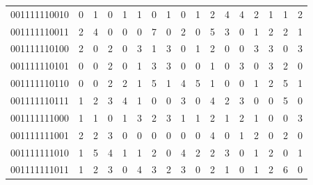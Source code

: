 \documentclass[10pt,a4paper]{article}
\begin{document}
\begin{longtable}{ |c|c|c|c|c|c|c|c|c|c|c|c|c|c|c|c|c| }
    001111110010              & 0                            & 1                                & 0                            & 1                              & 1   & 0   & 1   & 0   & 1   & 2   & 4   & 4   & 2   & 1   & 1   & 2   \\
    001111110011              & 2                            & 4                                & 0                            & 0                              & 0   & 7   & 0   & 2   & 0   & 5   & 3   & 0   & 1   & 2   & 2   & 1   \\
    001111110100              & 2                            & 0                                & 2                            & 0                              & 3   & 1   & 3   & 0   & 1   & 2   & 0   & 0   & 3   & 3   & 0   & 3   \\
    001111110101              & 0                            & 0                                & 2                            & 0                              & 1   & 3   & 3   & 0   & 0   & 1   & 0   & 3   & 0   & 3   & 2   & 0   \\
    001111110110              & 0                            & 0                                & 2                            & 2                              & 1   & 5   & 1   & 4   & 5   & 1   & 0   & 0   & 1   & 2   & 5   & 1   \\
    001111110111              & 1                            & 2                                & 3                            & 4                              & 1   & 0   & 0   & 3   & 0   & 4   & 2   & 3   & 0   & 0   & 5   & 0   \\
    001111111000              & 1                            & 1                                & 0                            & 1                              & 3   & 2   & 3   & 1   & 1   & 2   & 1   & 2   & 1   & 0   & 0   & 3   \\
    001111111001              & 2                            & 2                                & 3                            & 0                              & 0   & 0   & 0   & 0   & 0   & 4   & 0   & 1   & 2   & 0   & 2   & 0   \\
    001111111010              & 1                            & 5                                & 4                            & 1                              & 1   & 2   & 0   & 4   & 2   & 2   & 3   & 0   & 1   & 2   & 0   & 1   \\
    001111111011              & 1                            & 2                                & 3                            & 0                              & 4   & 3   & 2   & 3   & 0   & 2   & 1   & 0   & 1   & 2   & 6   & 0   \\

\end{longtable}
\end{document}
